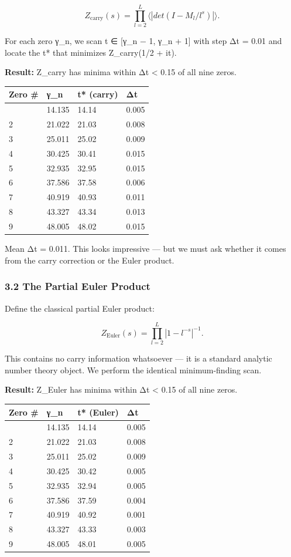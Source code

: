 \documentclass[
  11pt,
]{article}
\begin{document}
\[Z_{\text{carry}}(s) = \prod_{l=2}^{L} \bigl\langle |det(I - M_l / l^s)| \bigr\rangle.\]

For each zero γ\_n, we scan t ∈ {[}γ\_n − 1, γ\_n + 1{]} with step Δt = 0.01 and
locate the t* that minimizes Z\_carry(1/2 + it).

\textbf{Result:} Z\_carry has minima within Δt \textless{} 0.15 of all nine
zeros.

\begin{longtable}[]{@{}llll@{}}
\toprule\noalign{}
Zero \# & γ\_n & t* (carry) & Δt \\
\midrule\noalign{}
\endhead
\bottomrule\noalign{}
\endlastfoot
1 & 14.135 & 14.14 & 0.005 \\
2 & 21.022 & 21.03 & 0.008 \\
3 & 25.011 & 25.02 & 0.009 \\
4 & 30.425 & 30.41 & 0.015 \\
5 & 32.935 & 32.95 & 0.015 \\
6 & 37.586 & 37.58 & 0.006 \\
7 & 40.919 & 40.93 & 0.011 \\
8 & 43.327 & 43.34 & 0.013 \\
9 & 48.005 & 48.02 & 0.015 \\
\end{longtable}

Mean Δt = 0.011. This looks impressive --- but we must ask whether it comes from
the carry correction or the Euler product.

\subsubsection{3.2 The Partial Euler Product}\label{the-partial-euler-product}

Define the classical partial Euler product:

\[Z_{\text{Euler}}(s) = \prod_{l=2}^{L} |1 - l^{-s}|^{-1}.\]

This contains no carry information whatsoever --- it is a standard analytic
number theory object. We perform the identical minimum-finding scan.

\textbf{Result:} Z\_Euler has minima within Δt \textless{} 0.15 of all nine
zeros.

\begin{longtable}[]{@{}llll@{}}
\toprule\noalign{}
Zero \# & γ\_n & t* (Euler) & Δt \\
\midrule\noalign{}
\endhead
\bottomrule\noalign{}
\endlastfoot
1 & 14.135 & 14.14 & 0.005 \\
2 & 21.022 & 21.03 & 0.008 \\
3 & 25.011 & 25.02 & 0.009 \\
4 & 30.425 & 30.42 & 0.005 \\
5 & 32.935 & 32.94 & 0.005 \\
6 & 37.586 & 37.59 & 0.004 \\
7 & 40.919 & 40.92 & 0.001 \\
8 & 43.327 & 43.33 & 0.003 \\
9 & 48.005 & 48.01 & 0.005 \\
\end{longtable}
\end{document}
